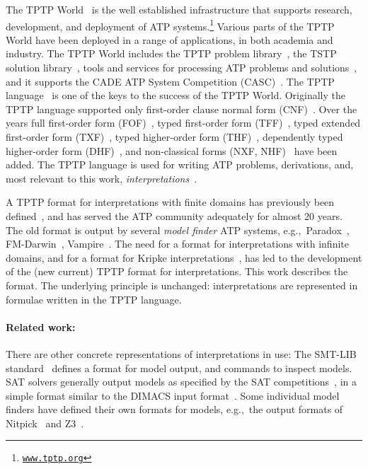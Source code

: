 \documentclass{easychair}
\begin{document}
The TPTP World~\cite{Sut17,Sut24} is the well established infrastructure that supports research, 
development, and deployment of 
ATP systems.\footnote{%
\href{https://www.tptp.org}{\tt www.tptp.org}}
Various parts of the TPTP World have been deployed in a range of applications, in both academia 
and industry.
The TPTP World includes the TPTP problem library~\cite{Sut09}, 
the TSTP solution library~\cite{Sut10}, 
tools and services for processing ATP problems and solutions~\cite{Sut10}, 
and it supports the CADE ATP System Competition (CASC)~\cite{Sut16}.
The TPTP language~\cite{Sut23-IGPL} is one of the keys to the success of the TPTP World.
Originally the TPTP language supported only first-order clause normal form (CNF)~\cite{SS98-JAR}.
Over the years full first-order form (FOF)~\cite{Sut09}, 
typed first-order form (TFF)~\cite{SS+12,BP13-TFF1}, 
typed extended first-order form (TXF)~\cite{SK18}, 
typed higher-order form (THF)~\cite{SB10,KSR16}, 
dependently typed higher-order form (DHF)~\cite{RK+25},
and non-classical forms (NXF, NHF)~\cite{SF+22}
have been added.
The TPTP language is used for writing ATP problems, derivations, and, most relevant to this 
work, \emph{interpretations}~\cite{SS+06,Sut08-KEAPPA}.

A TPTP format for interpretations with finite domains has previously been defined~\cite{SS+06},
and has served the ATP community adequately for almost 20 years. 
The old format is output by several \emph{model finder} ATP systems, e.g.,~Paradox~\cite{CS03}, 
FM-Darwin~\cite{BF+06}, Vampire~\cite{KV13}.
The need for a format for interpretations with infinite domains, and for a format for Kripke 
interpretations~\cite{Kri63}, has led to the development of the (new current) TPTP format for 
interpretations.
This work describes the format.
The underlying principle is unchanged: interpretations are represented in formulae written in
the TPTP language.

\paragraph{Related work:}
There are other concrete representations of interpretations in use:
The SMT-LIB standard~\cite{BFT17} defines a format for model output, and commands to inspect 
models.  
SAT solvers generally output models as specified by the SAT competitions~\cite{JL+12}, in a 
simple format similar to the DIMACS input format~\cite{Bab93}.
Some individual model finders have defined their own formats for models, e.g.,~the 
output formats of Nitpick~\cite{BN10-ITP} and Z3~\cite{dMB08}.
\end{document}
